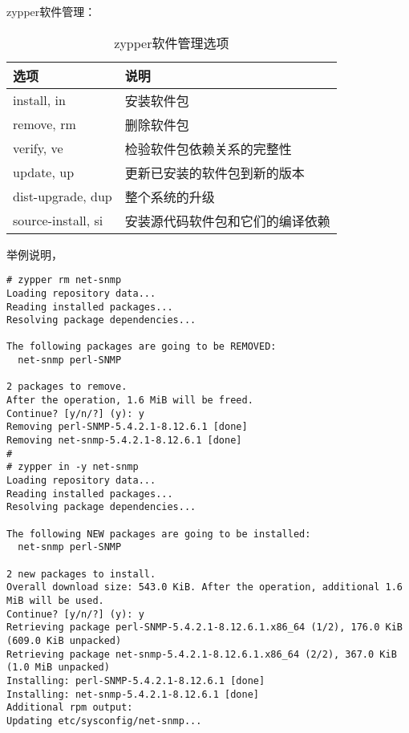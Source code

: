 zypper软件管理：

\begin{table}[!htbp]
  \centering
    \caption{zypper软件管理选项}
    \begin{tabular}{ll}
      \toprule
      选项               & 说明 \\
      \midrule
      install, in        & 安装软件包 \\
      remove, rm         & 删除软件包 \\
      verify, ve         & 检验软件包依赖关系的完整性 \\
      update, up         & 更新已安装的软件包到新的版本 \\
      dist-upgrade, dup  & 整个系统的升级 \\
      source-install, si & 安装源代码软件包和它们的编译依赖 \\
      \bottomrule
    \end{tabular}
\end{table}

举例说明，

\begin{verbatim}
# zypper rm net-snmp
Loading repository data...
Reading installed packages...
Resolving package dependencies...

The following packages are going to be REMOVED:
  net-snmp perl-SNMP 

2 packages to remove.
After the operation, 1.6 MiB will be freed.
Continue? [y/n/?] (y): y
Removing perl-SNMP-5.4.2.1-8.12.6.1 [done]
Removing net-snmp-5.4.2.1-8.12.6.1 [done]
#
# zypper in -y net-snmp
Loading repository data...
Reading installed packages...
Resolving package dependencies...

The following NEW packages are going to be installed:
  net-snmp perl-SNMP 

2 new packages to install.
Overall download size: 543.0 KiB. After the operation, additional 1.6 MiB will be used.
Continue? [y/n/?] (y): y
Retrieving package perl-SNMP-5.4.2.1-8.12.6.1.x86_64 (1/2), 176.0 KiB (609.0 KiB unpacked)
Retrieving package net-snmp-5.4.2.1-8.12.6.1.x86_64 (2/2), 367.0 KiB (1.0 MiB unpacked)
Installing: perl-SNMP-5.4.2.1-8.12.6.1 [done]
Installing: net-snmp-5.4.2.1-8.12.6.1 [done]
Additional rpm output:
Updating etc/sysconfig/net-snmp...
\end{verbatim}
